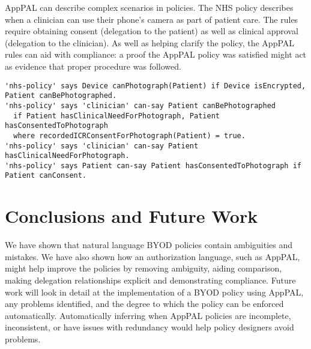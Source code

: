 \documentclass{easychair}
\newcommand{\dotdotdot}[1]{$[\cdots]$}
\begin{document}
AppPAL can describe complex scenarios in policies.
The NHS policy describes when a clinician can use their phone's camera as part of patient care.
The rules require obtaining consent (delegation to the patient) as well as clinical approval (delegation to the clinician). 
As well as helping clarify the policy, the AppPAL rules can aid with compliance:
    a proof the AppPAL policy was satisfied might act as evidence that proper procedure was followed.
\begin{lstlisting}[title={\footnotesize\textbf{NHS}:~\itshape ``%
Some mobile devices have the ability to take photographs / videos. 
This function should not be used for photographs / videos of an individual’s care and treatment unless the device has encryption enabled and it is clinically appropriate to do so.
If the photography / video facility is used as part of the recording of an individual’s care and treatment, the device user must ensure that the consent of the individual has been collected prior to taking any photograph / video. 
\dotdotdot{The individual needs to fully understand why the photograph / video is being taken and the member of staff plans to do with it, in particular if it will be shared. }
A record of the consent must be entered into the individual’s care record. 
''}]
'nhs-policy' says Device canPhotograph(Patient) if Device isEncrypted, Patient canBePhotographed.
'nhs-policy' says 'clinician' can-say Patient canBePhotographed
  if Patient hasClinicalNeedForPhotograph, Patient hasConsentedToPhotograph
  where recordedICRConsentForPhotograph(Patient) = true.
'nhs-policy' says 'clinician' can-say Patient hasClinicalNeedForPhotograph.
'nhs-policy' says Patient can-say Patient hasConsentedToPhotograph if Patient canConsent.
\end{lstlisting}

\section{Conclusions and Future Work}

We have shown that natural language BYOD policies contain ambiguities and mistakes.
We have also shown how an authorization language, such as AppPAL, might help improve the policies by removing ambiguity, aiding comparison, making delegation relationships explicit and demonstrating compliance.
Future work will look in detail at the implementation of a BYOD policy using AppPAL, any problems identified, and the degree to which the policy can be enforced automatically.
Automatically inferring when AppPAL policies are incomplete, inconsistent, or have issues with redundancy would help policy designers avoid problems.
\end{document}
